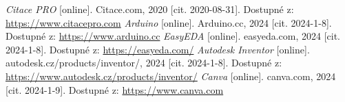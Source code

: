 \documentclass[12pt, a4paper, twoside]{report}
\begin{document}
		
		\renewcommand{\bibname}{Seznam použitých zdrojů}
		\begin{thebibliography}{99}
			\textit{Citace PRO} [online]. Citace.com, 2020 [cit. 2020-08-31]. Dostupné z: \url{https://www.citacepro.com}
			\textit{Arduino} [online]. Arduino.cc, 2024 [cit. 2024-1-8]. Dostupné z: \url{https://www.arduino.cc}
			\textit{EasyEDA} [online]. easyeda.com, 2024 [cit. 2024-1-8]. Dostupné z: \url{https://easyeda.com/}
			\textit{Autodesk Inventor} [online]. autodesk.cz/products/inventor/, 2024 [cit. 2024-1-8]. Dostupné z: \url{https://www.autodesk.cz/products/inventor/}
			\textit{Canva} [online]. canva.com, 2024 [cit. 2024-1-9]. Dostupné z: \url{https://www.canva.com}
		\end{thebibliography}
		
		\listoffigures
		
		\appendix %
		
		[\vspace{-22pt}] %
		
		
		
	
\end{document}
